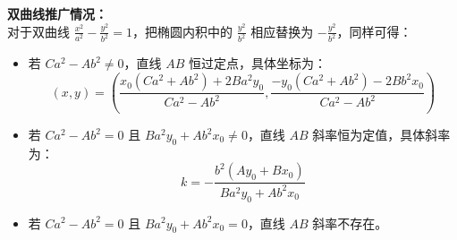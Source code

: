 \begin{solution}
\textbf{双曲线推广情况：}\\
对于双曲线 $\frac{x^2}{a^2} - \frac{y^2}{b^2} = 1$，把椭圆内积中的 $\frac{y^2}{b^2}$ 相应替换为 $-\frac{y^2}{b^2}$，同样可得：
\begin{itemize}
\item 若 $C a^2 - A b^2 \neq 0$，直线 $AB$ 恒过定点，具体坐标为：
\[ (x, y) = \left( \frac{x_0 (C a^2 + A b^2) + 2 B a^2 y_0}{C a^2 - A b^2}, \frac{-y_0 (C a^2 + A b^2) - 2 B b^2 x_0}{C a^2 - A b^2} \right) \]
\item 若 $C a^2 - A b^2 = 0$ 且 $B a^2 y_0 + A b^2 x_0 \neq 0$，直线 $AB$ 斜率恒为定值，具体斜率为：
\[ k = -\frac{b^2 (A y_0 + B x_0)}{B a^2 y_0 + A b^2 x_0} \]
\item 若 $C a^2 - A b^2 = 0$ 且 $B a^2 y_0 + A b^2 x_0 = 0$，直线 $AB$ 斜率不存在。
\end{itemize}
\end{solution}

